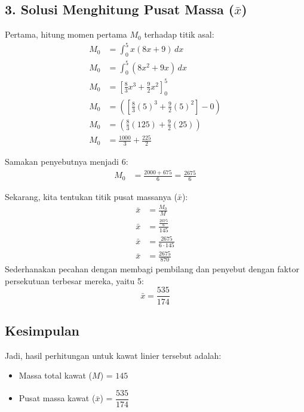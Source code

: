 \documentclass[12pt,a4paper]{article}
\begin{document}
\subsection*{3. Solusi Menghitung Pusat Massa ($\bar{x}$)}
Pertama, hitung momen pertama $M_0$ terhadap titik asal:
\begin{align*}
  M_0 &= \int_{0}^{5} x(8x + 9) \, dx \\
  M_0 &= \int_{0}^{5} (8x^2 + 9x) \, dx \\
  M_0 &= \left[ \frac{8}{3}x^3 + \frac{9}{2}x^2 \right]_{0}^{5} \\
  M_0 &= \left( \left[ \frac{8}{3}(5)^3 + \frac{9}{2}(5)^2 \right] - 0 \right) \\
  M_0 &= \left( \frac{8}{3}(125) + \frac{9}{2}(25) \right) \\
  M_0 &= \frac{1000}{3} + \frac{225}{2}
\end{align*}

Samakan penyebutnya menjadi 6:
\begin{align*}
  M_0 &= \frac{2000 + 675}{6} = \frac{2675}{6}
\end{align*}

Sekarang, kita tentukan titik pusat massanya ($\bar{x}$):
\begin{align*}
  \bar{x} &= \frac{M_0}{M} \\
  \bar{x} &= \frac{\frac{2675}{6}}{145} \\
  \bar{x} &= \frac{2675}{6 \cdot 145} \\
  \bar{x} &= \frac{2675}{870}
\end{align*}
Sederhanakan pecahan dengan membagi pembilang dan penyebut dengan faktor persekutuan terbesar mereka, yaitu 5:
\begin{equation*}
  \bar{x} = \frac{535}{174}
\end{equation*}

\subsection*{Kesimpulan}
Jadi, hasil perhitungan untuk kawat linier tersebut adalah:
\begin{itemize}
  \item Massa total kawat ($M$) = \textbf{$145$}
  \item Pusat massa kawat ($\bar{x}$) = \textbf{$\dfrac{535}{174}$}
\end{itemize}
\end{document}
